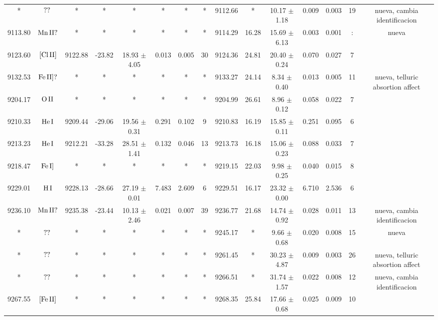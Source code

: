 \documentclass{article}
\begin{document}
\begin{table*}
\begin{adjustbox}{width=\textwidth}
\begin{tabular}{ccccccccccccccc}
* & $\mbox{??}\thinspace \mbox{}$ & * & * & * & * & * & * & 9112.66 & * & 10.17 $\pm$ 1.18 & 0.009 & 0.003 & 19 &  nueva, cambia identificacion \\
9113.80 & $\mbox{Mn}\thinspace \mbox{II?}$ & * & * & * & * & * & * & 9114.29 & 16.28 & 15.69 $\pm$ 6.13 & 0.003 & 0.001 & : &  nueva \\
9123.60 & $\mbox{[Cl}\thinspace \mbox{II]}$ & 9122.88 & -23.82 & 18.93 $\pm$ 4.05 & 0.013 & 0.005 & 30 & 9124.36 & 24.81 & 20.40 $\pm$ 0.24 & 0.070 & 0.027 & 7 &  \\
9132.53 & $\mbox{Fe}\thinspace \mbox{II]?}$ & * & * & * & * & * & * & 9133.27 & 24.14 & 8.34 $\pm$ 0.40 & 0.013 & 0.005 & 11 &  nueva, telluric absortion affect \\
9204.17 & $\mbox{O}\thinspace \mbox{II}$ & * & * & * & * & * & * & 9204.99 & 26.61 & 8.96 $\pm$ 0.12 & 0.058 & 0.022 & 7 &  \\
9210.33 & $\mbox{He}\thinspace \mbox{I}$ & 9209.44 & -29.06 & 19.56 $\pm$ 0.31 & 0.291 & 0.102 & 9 & 9210.83 & 16.19 & 15.85 $\pm$ 0.11 & 0.251 & 0.095 & 6 &  \\
9213.23 & $\mbox{He}\thinspace \mbox{I}$ & 9212.21 & -33.28 & 28.51 $\pm$ 1.41 & 0.132 & 0.046 & 13 & 9213.73 & 16.18 & 15.06 $\pm$ 0.23 & 0.088 & 0.033 & 7 &  \\
9218.47 & $\mbox{Fe}\thinspace \mbox{I]}$ & * & * & * & * & * & * & 9219.15 & 22.03 & 9.98 $\pm$ 0.25 & 0.040 & 0.015 & 8 &  \\
9229.01 & $\mbox{H}\thinspace \mbox{I}$ & 9228.13 & -28.66 & 27.19 $\pm$ 0.01 & 7.483 & 2.609 & 6 & 9229.51 & 16.17 & 23.32 $\pm$ 0.00 & 6.710 & 2.536 & 6 &  \\
9236.10 & $\mbox{Mn}\thinspace \mbox{II?}$ & 9235.38 & -23.44 & 10.13 $\pm$ 2.46 & 0.021 & 0.007 & 39 & 9236.77 & 21.68 & 14.74 $\pm$ 0.92 & 0.028 & 0.011 & 13 &  nueva, cambia identificacion \\
* & $\mbox{??}\thinspace \mbox{}$ & * & * & * & * & * & * & 9245.17 & * & 9.66 $\pm$ 0.68 & 0.020 & 0.008 & 15 &  nueva \\
* & $\mbox{??}\thinspace \mbox{}$ & * & * & * & * & * & * & 9261.45 & * & 30.23 $\pm$ 4.87 & 0.009 & 0.003 & 26 &  nueva, telluric absortion affect \\
* & $\mbox{??}\thinspace \mbox{}$ & * & * & * & * & * & * & 9266.51 & * & 31.74 $\pm$ 1.57 & 0.022 & 0.008 & 12 &  nueva, cambia identificacion \\
9267.55 & $\mbox{[Fe}\thinspace \mbox{II]}$ & * & * & * & * & * & * & 9268.35 & 25.84 & 17.66 $\pm$ 0.68 & 0.025 & 0.009 & 10 &  \\

\end{tabular}
\end{adjustbox}
\end{table*}
\end{document}

